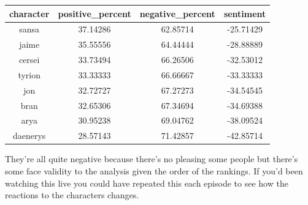 \documentclass[]{book}
\newenvironment{Shaded}{\begin{snugshade}}{\end{snugshade}}
\newcommand{\DataTypeTok}[1]{\textcolor[rgb]{0.13,0.29,0.53}{#1}}
\newcommand{\DecValTok}[1]{\textcolor[rgb]{0.00,0.00,0.81}{#1}}
\newcommand{\KeywordTok}[1]{\textcolor[rgb]{0.13,0.29,0.53}{\textbf{#1}}}
\newcommand{\NormalTok}[1]{#1}
\newcommand{\OperatorTok}[1]{\textcolor[rgb]{0.81,0.36,0.00}{\textbf{#1}}}
\newcommand{\StringTok}[1]{\textcolor[rgb]{0.31,0.60,0.02}{#1}}
\begin{document}
\begin{Shaded}
\end{Shaded}

\begin{tabular}{c|c|c|c}
\hline
character & positive\_percent & negative\_percent & sentiment\\
\hline
sansa & 37.14286 & 62.85714 & -25.71429\\
\hline
jaime & 35.55556 & 64.44444 & -28.88889\\
\hline
cersei & 33.73494 & 66.26506 & -32.53012\\
\hline
tyrion & 33.33333 & 66.66667 & -33.33333\\
\hline
jon & 32.72727 & 67.27273 & -34.54545\\
\hline
bran & 32.65306 & 67.34694 & -34.69388\\
\hline
arya & 30.95238 & 69.04762 & -38.09524\\
\hline
daenerys & 28.57143 & 71.42857 & -42.85714\\
\hline
\end{tabular}

They're all quite negative because there's no pleasing some people but there's some face validity to the analysis given the order of the rankings. If you'd been watching this live you could have repeated this each episode to see how the reactions to the characters changes.
\end{document}
